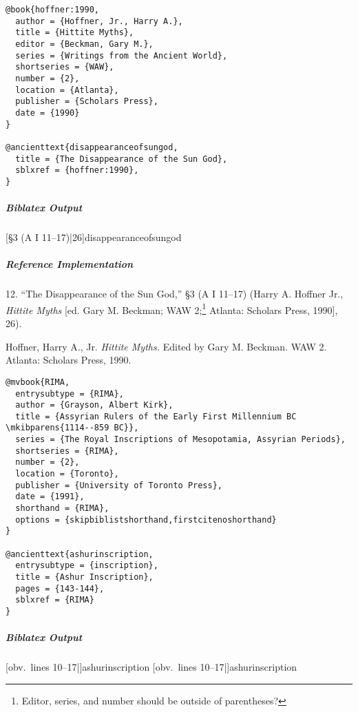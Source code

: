 \documentclass[a4paper]{article}
\newenvironment{biboutput}{%
  \subparagraph{Biblatex Output}
}{\color{black}}
\newenvironment{refimp}{%
  \subparagraph{Reference Implementation}
  \color{reference-colour}
  \rm
}{\par\color{black}}
\begin{document}
\medskip

\begin{lstlisting}
@book{hoffner:1990,
  author = {Hoffner, Jr., Harry A.},
  title = {Hittite Myths},
  editor = {Beckman, Gary M.},
  series = {Writings from the Ancient World},
  shortseries = {WAW},
  number = {2},
  location = {Atlanta},
  publisher = {Scholars Press},
  date = {1990}
}

@ancienttext{disappearanceofsungod,
  title = {The Disappearance of the Sun God},
  sblxref = {hoffner:1990},
}
\end{lstlisting}

\begin{biboutput}
  [§3 (A I 11--17)|26]{disappearanceofsungod}
\end{biboutput}

\begin{refimp}
  12. “The Disappearance of the Sun God,” §3 (A I 11–17) (Harry A. Hoffner
  Jr., \emph{Hittite Myths} [ed. Gary M. Beckman; WAW 2;\footnote{Editor,
  series, and number should be outside of parentheses?} Atlanta: Scholars
  Press, 1990], 26).
  
  \hangindent\bibindent Hoffner, Harry A., Jr. \emph{Hittite Myths.} Edited by
  Gary M. Beckman. WAW 2. Atlanta: Scholars Press, 1990.

\end{refimp}

\medskip

\begin{lstlisting}
@mvbook{RIMA,
  entrysubtype = {RIMA},
  author = {Grayson, Albert Kirk},
  title = {Assyrian Rulers of the Early First Millennium BC \mkibparens{1114--859 BC}},
  series = {The Royal Inscriptions of Mesopotamia, Assyrian Periods},
  shortseries = {RIMA},
  number = {2},
  location = {Toronto},
  publisher = {University of Toronto Press},
  date = {1991},
  shorthand = {RIMA},
  options = {skipbiblistshorthand,firstcitenoshorthand}
}

@ancienttext{ashurinscription,
  entrysubtype = {inscription},
  title = {Ashur Inscription},
  pages = {143-144},
  sblxref = {RIMA}
}
\end{lstlisting}

\begin{biboutput}
  [obv.\ lines 10--17|]{ashurinscription}
  [obv.\ lines 10--17|]{ashurinscription}
\end{biboutput}
\end{document}
